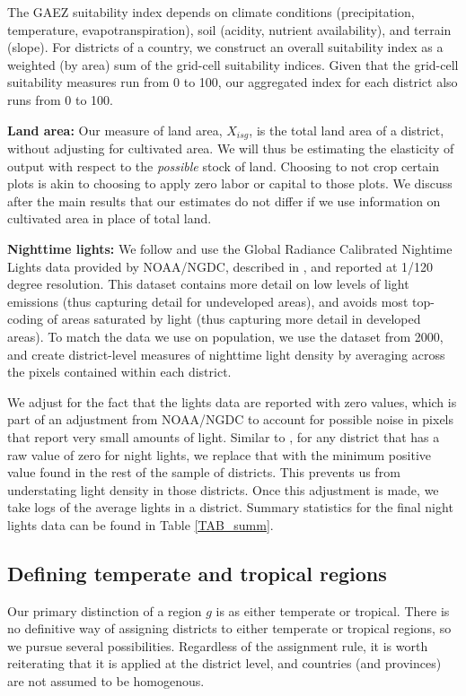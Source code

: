 \documentclass[11pt]{article}
\begin{document}
The GAEZ suitability index depends on climate conditions (precipitation, temperature, evapotranspiration), soil (acidity, nutrient availability), and terrain (slope). For districts of a country, we construct an overall suitability index as a weighted (by area) sum of the grid-cell suitability indices. Given that the grid-cell suitability measures run from 0 to 100, our aggregated index for each district also runs from 0 to 100.

\vspace{.5cm}\noindent\textbf{Land area:} Our measure of land area, $X_{isg}$, is the total land area of a district, without adjusting for cultivated area. We will thus be estimating the elasticity of output with respect to the \textit{possible} stock of land. Choosing to not crop certain plots is akin to choosing to apply zero labor or capital to those plots. We discuss after the main results that our estimates do not differ if we use information on cultivated area in place of total land.

\vspace{.5cm}\noindent\textbf{Nighttime lights:} We follow \citet{hssw2016} and use the Global Radiance Calibrated Nightime Lights data provided by NOAA/NGDC, described in \citet{Elvidge1999}, and reported at 1/120 degree resolution. This dataset contains more detail on low levels of light emissions (thus capturing detail for undeveloped areas), and avoids most top-coding of areas saturated by light (thus capturing more detail in developed areas). To match the data we use on population, we use the dataset from 2000, and create district-level measures of nighttime light density by averaging across the pixels contained within each district.

We adjust for the fact that the lights data are reported with zero values, which is part of an adjustment from NOAA/NGDC to account for possible noise in pixels that report very small amounts of light. Similar to \citet{hssw2016}, for any district that has a raw value of zero for night lights, we replace that with the minimum positive value found in the rest of the sample of districts. This prevents us from understating light density in those districts. Once this adjustment is made, we take logs of the average lights in a district. Summary statistics for the final night lights data can be found in Table \ref{TAB_summ}.

\subsection{Defining temperate and tropical regions}
Our primary distinction of a region $g$ is as either temperate or tropical. There is no definitive way of assigning districts to either temperate or tropical regions, so we pursue several possibilities. Regardless of the assignment rule, it is worth reiterating that it is applied at the district level, and countries (and provinces) are not assumed to be homogenous. 
\end{document}
